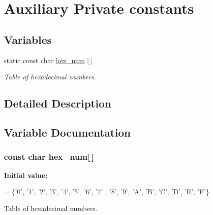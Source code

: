 \hypertarget{group___k_n_x___aux___private___consts}{}\section{Auxiliary Private constants}
\label{group___k_n_x___aux___private___consts}
\subsection*{Variables}
\begin{DoxyCompactItemize}
\item 
static const char \hyperlink{group___k_n_x___aux___private___consts_ga938e545954f0ddfa9a048c6fc3f30776}{hex\+\_\+num} \mbox{[}$\,$\mbox{]}
\begin{DoxyCompactList}\small\item\em Table of hexadecimal numbers. \end{DoxyCompactList}\end{DoxyCompactItemize}


\subsection{Detailed Description}


\subsection{Variable Documentation}
\subsubsection[{\texorpdfstring{hex\+\_\+num}{hex_num}}]{\setlength{\rightskip}{0pt plus 5cm}const char hex\+\_\+num\mbox{[}$\,$\mbox{]}\hspace{0.3cm}{\ttfamily [static]}}\hypertarget{group___k_n_x___aux___private___consts_ga938e545954f0ddfa9a048c6fc3f30776}{}\label{group___k_n_x___aux___private___consts_ga938e545954f0ddfa9a048c6fc3f30776}
{\bfseries Initial value\+:}
\begin{DoxyCode}
= \{\textcolor{charliteral}{'0'}, \textcolor{charliteral}{'1'}, \textcolor{charliteral}{'2'}, \textcolor{charliteral}{'3'}, \textcolor{charliteral}{'4'}, \textcolor{charliteral}{'5'}, \textcolor{charliteral}{'6'}, \textcolor{charliteral}{'7'} , \textcolor{charliteral}{'8'}, \textcolor{charliteral}{'9'},
                                \textcolor{charliteral}{'A'}, \textcolor{charliteral}{'B'}, \textcolor{charliteral}{'C'}, \textcolor{charliteral}{'D'}, \textcolor{charliteral}{'E'}, \textcolor{charliteral}{'F'}\}
\end{DoxyCode}


Table of hexadecimal numbers. 

